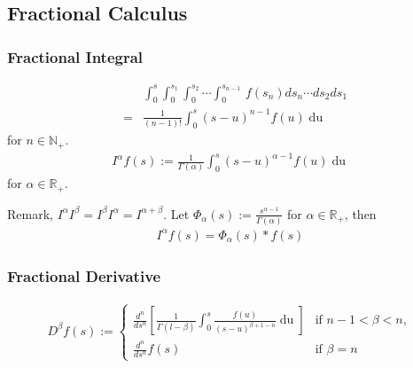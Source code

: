 \documentclass[a4paper, twoside, 11pt]{article}
\theoremstyle{definition}
\begin{document}
\subsection{Fractional Calculus}
\subsubsection{Fractional Integral}
\begin{eqnarray*}
  &&\int_0^s\int_0^{s_1}\int_0^{s_2}\cdots\int_0^{s_{n-1}}\, f(s_n)ds_n\cdots ds_2 ds_1\\
  &=& \frac{1}{(n-1)!} \int_0^s (s-u)^{n-1} f(u) \mathop{du}
\end{eqnarray*}
for $n\in \mathbb{N}_+$.
\begin{eqnarray}
  I^\alpha f(s) := \frac{1}{\Gamma(\alpha)} \int^s_0 (s-u)^{\alpha-1} f(u) \mathop{du}
  \label{sec:fraint}
\end{eqnarray}
for $\alpha \in \mathbb{R}_+$.

Remark, $I^\alpha I^\beta = I^\beta I^\alpha = I^{\alpha+\beta}$.
Let $\Phi_\alpha(s):= \frac{s^{\alpha-1}}{\Gamma(\alpha)}$ for $\alpha \in \mathbb{R}_+$, then
\begin{eqnarray}
  I^\alpha f(s) = \Phi_\alpha(s) \ast f(s)
  \label{}
\end{eqnarray}

\subsubsection{Fractional Derivative}

\begin{eqnarray}
  D^\beta f(s) := \begin{cases} \frac{d^n}{ds^n}[\frac{1}{\Gamma(l-\beta)}\int_0^s \frac{f(u)}{(s-u)^{\beta + 1 - n}}\mathop{du}] &\mbox{if } n-1 < \beta < n,\\
	\frac{d^n}{ds^n} f(s) & \mbox{if } \beta=n
  \end{cases}
  \label{sec:frader}
\end{eqnarray}
\end{document}
